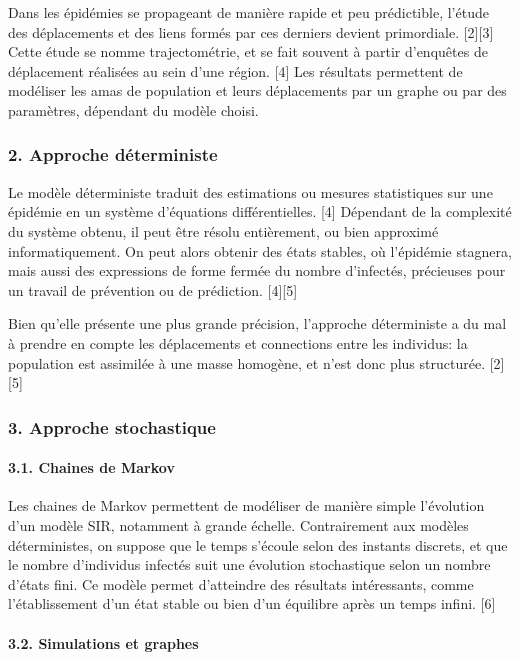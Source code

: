 \documentclass{article}
\begin{document}
Dans les épidémies se propageant de manière rapide et peu prédictible, l'étude des déplacements et des liens formés par ces derniers devient primordiale. [2][3] Cette étude se nomme trajectométrie, et se fait souvent à partir d'enquêtes de déplacement réalisées au sein d'une région. [4] Les résultats permettent de modéliser les amas de population et leurs déplacements par un graphe ou par des paramètres, dépendant du modèle choisi.

\subsubsection{2. Approche déterministe}

Le modèle déterministe traduit des estimations ou mesures statistiques sur une épidémie en un système d'équations différentielles. [4] Dépendant de la complexité du système obtenu, il peut être résolu entièrement, ou bien approximé informatiquement. On peut alors obtenir des états stables, où l'épidémie stagnera, mais aussi des expressions de forme fermée du nombre d'infectés, précieuses pour un travail de prévention ou de prédiction. [4][5]

Bien qu'elle présente une plus grande précision, l'approche déterministe a du mal à prendre en compte les déplacements et connections entre les individus: la population est assimilée à une masse homogène, et n'est donc plus structurée. [2][5]

\subsubsection{3. Approche stochastique}

\paragraph{3.1. Chaines de Markov}\mbox{}\newline

Les chaines de Markov permettent de modéliser de manière simple l'évolution d'un modèle SIR, notamment à grande échelle.
Contrairement aux modèles déterministes, on suppose que le temps s'écoule selon des instants discrets, et que le nombre d'individus infectés suit une évolution stochastique selon un nombre d'états fini. Ce modèle permet d'atteindre des résultats intéressants, comme l'établissement d'un état stable ou bien d'un équilibre après un temps infini. [6]

\paragraph{3.2. Simulations et graphes}\mbox{}\newline
\end{document}
